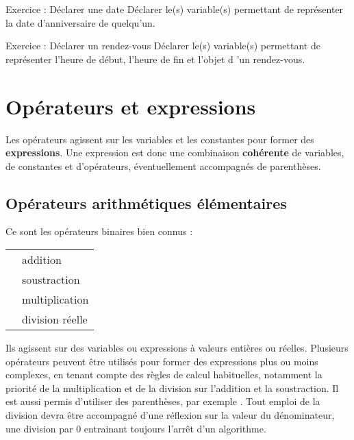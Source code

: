			
			\begin{Emphase}[exercice]{Exercice : Déclarer une date}
				Déclarer le(s) variable(s) permettant de représenter la date
				d'anniversaire de quelqu'un.
			\end{Emphase}
			
			
			\begin{Emphase}[exercice]{Exercice : Déclarer un rendez-vous}
				Déclarer le(s) variable(s) permettant de représenter
				l'heure de début, l'heure de fin et
				l'objet d 'un rendez-vous.
			\end{Emphase}

	\section{Opérateurs et expressions}
	
		Les opérateurs agissent sur les variables et les constantes pour former
		des \textbf{expressions}. Une expression est donc une combinaison
		\textbf{cohérente} de variables, de constantes et d’opérateurs,
		éventuellement accompagnés de parenthèses.
	
		\subsection{Opérateurs arithmétiques élémentaires}
	
			Ce sont les opérateurs binaires bien connus :
	
			\begin{center}
			\tablehead{}
			\begin{supertabular}{m{1cm}|m{12cm}}
			\raggedleft  \textstyleCodeInsr{+} & addition\\
			\raggedleft  \textstyleCodeInsr{-} & soustraction\\
			\raggedleft  \textstyleCodeInsr{*} & multiplication\\
			\raggedleft  \textstyleCodeInsr{/} & division réelle\\
			\end{supertabular}
			\end{center}
	
			Ils agissent sur des variables ou expressions à valeurs entières ou
			réelles. Plusieurs opérateurs peuvent être utilisés pour former des
			expressions plus ou moins complexes, en tenant compte des règles de
			calcul habituelles, notamment la priorité de la multiplication et de la
			division sur l’addition et la soustraction. Il est aussi permis
			d’utiliser des parenthèses, par exemple . Tout emploi de la division devra être accompagné d’une réflexion
			sur la valeur du dénominateur, une division par 0 entrainant toujours
			l’arrêt d’un algorithme.
	
